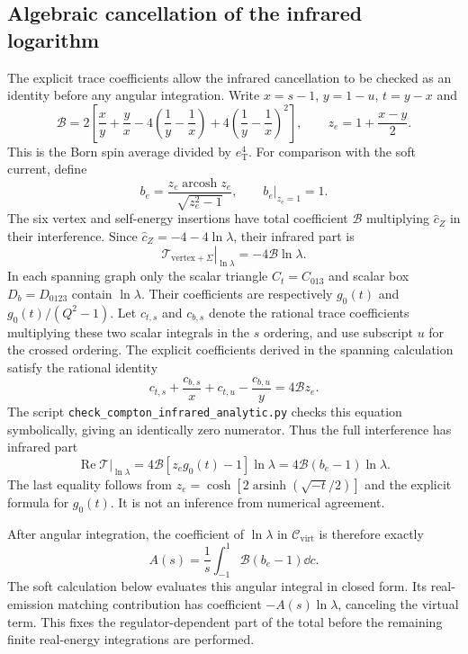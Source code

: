 \subsection{Algebraic cancellation of the infrared logarithm}
The explicit trace coefficients allow the infrared cancellation to
be checked as an identity before any angular integration. Write
$x=s-1$, $y=1-u$, $t=y-x$ and
\begin{equation}
 \mathcal B=2\left[\frac{x}{y}+\frac{y}{x}
 -4\left(\frac1y-\frac1x\right)
 +4\left(\frac1y-\frac1x\right)^2\right],\qquad
 z_e=1+\frac{x-y}{2}.
\end{equation}
This is the Born spin average divided by $e_{\mathrm T}^4$.
For comparison with the soft current, define
\begin{equation}
 b_e=\frac{z_e\operatorname{arcosh}z_e}{\sqrt{z_e^2-1}},
 \qquad b_e\big|_{z_e=1}=1.
\end{equation}
The six vertex and self-energy insertions have total coefficient
$\mathcal B$ multiplying $\widehat c_Z$ in their interference.
Since $\widehat c_Z=-4-4\ln\lambda$, their infrared part is
\begin{equation}
 \left.\mathcal T_{\mathrm{vertex}+\Sigma}\right|_{\ln\lambda}
 =-4\mathcal B\ln\lambda.
\end{equation}
In each spanning graph only the scalar triangle $C_t=C_{013}$ and
scalar box $D_b=D_{0123}$ contain $\ln\lambda$. Their coefficients are respectively
$g_0(t)$ and $g_0(t)/(Q^2-1)$. Let $c_{t,s}$ and $c_{b,s}$ denote
the rational trace coefficients multiplying these two scalar
integrals in the $s$ ordering, and use subscript $u$ for the crossed
ordering. The explicit coefficients derived in the spanning
calculation satisfy the rational identity
\begin{equation}
 c_{t,s}+\frac{c_{b,s}}x+c_{t,u}-\frac{c_{b,u}}y
             =4\mathcal B z_e.
 \label{eq:comp-supp-box-IR-identity}
\end{equation}
The script \nolinkurl{check_compton_infrared_analytic.py} checks
this equation symbolically, giving an identically zero numerator.
Thus the full interference has infrared part
\begin{equation}
 \left.\operatorname{Re}\mathcal T\right|_{\ln\lambda}
 =4\mathcal B[z_e g_0(t)-1]\ln\lambda
 =4\mathcal B(b_e-1)\ln\lambda.
\end{equation}
The last equality follows from
$z_e=\cosh[2\operatorname{arsinh}(\sqrt{-t}/2)]$ and the explicit
formula for $g_0(t)$. It is not an inference from numerical agreement.

After angular integration, the coefficient of $\ln\lambda$ in
$\mathcal C_{\mathrm{virt}}$ is therefore exactly
\begin{equation}
 A(s)=\frac1s\int_{-1}^1\mathcal B(b_e-1)\dd c.
\end{equation}
The soft calculation below evaluates this angular integral in
closed form. Its real-emission matching contribution has coefficient
$-A(s)\ln\lambda$, canceling the virtual term. This fixes the
regulator-dependent part of the total before the remaining finite
real-energy integrations are performed.
